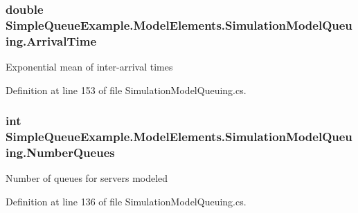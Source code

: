 \subsubsection[{\texorpdfstring{Arrival\+Time}{ArrivalTime}}]{\setlength{\rightskip}{0pt plus 5cm}double Simple\+Queue\+Example.\+Model\+Elements.\+Simulation\+Model\+Queuing.\+Arrival\+Time\hspace{0.3cm}{\ttfamily [get]}}\hypertarget{class_simple_queue_example_1_1_model_elements_1_1_simulation_model_queuing_a2e92162a3080a19ed150384b55f0223f}{}\label{class_simple_queue_example_1_1_model_elements_1_1_simulation_model_queuing_a2e92162a3080a19ed150384b55f0223f}


Exponential mean of inter-\/arrival times 



Definition at line 153 of file Simulation\+Model\+Queuing.\+cs.

\subsubsection[{\texorpdfstring{Number\+Queues}{NumberQueues}}]{\setlength{\rightskip}{0pt plus 5cm}int Simple\+Queue\+Example.\+Model\+Elements.\+Simulation\+Model\+Queuing.\+Number\+Queues\hspace{0.3cm}{\ttfamily [get]}}\hypertarget{class_simple_queue_example_1_1_model_elements_1_1_simulation_model_queuing_ae59d22dc2eac49996cffe2881f1a2c37}{}\label{class_simple_queue_example_1_1_model_elements_1_1_simulation_model_queuing_ae59d22dc2eac49996cffe2881f1a2c37}


Number of queues for servers modeled 



Definition at line 136 of file Simulation\+Model\+Queuing.\+cs.

